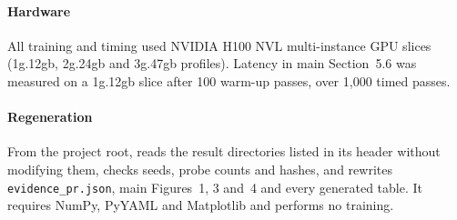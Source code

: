 \documentclass[11pt]{article}
\begin{document}
\paragraph{Hardware}
All training and timing used NVIDIA H100 NVL multi-instance GPU slices
(1g.12gb, 2g.24gb and 3g.47gb profiles). Latency in main Section~5.6 was
measured on a 1g.12gb slice after 100 warm-up passes, over 1,000 timed passes.

\paragraph{Regeneration}
From the project root,
 reads the result directories listed in its header without modifying them,
checks seeds, probe counts and hashes, and rewrites \texttt{evidence\_pr.json},
main Figures~1, 3 and~4 and every generated table. It requires NumPy, PyYAML and
Matplotlib and performs no training.
\end{document}
